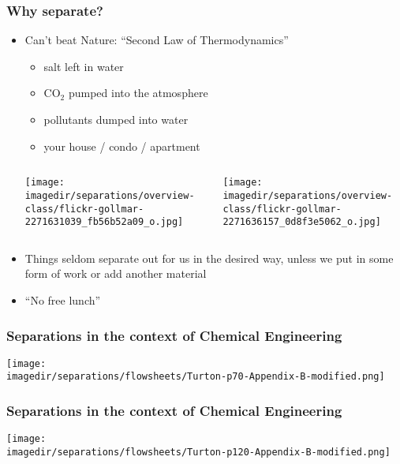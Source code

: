 \begin{frame}\frametitle{Why separate?}
	\begin{itemize}
		\item	Can't beat Nature: ``Second Law of Thermodynamics''
			\begin{itemize}
				\item	salt left in water
				\item	$\text{CO}_2$ pumped into the atmosphere
				\item	pollutants dumped into water
				\item	your house / condo / apartment
			\end{itemize}
		
		\begin{columns}[c]
				\centerline{\texttt{[image: \\imagedir/separations/overview-class/flickr-gollmar-2271631039\_fb56b52a09\_o.jpg]}}
				\centerline{\texttt{[image: \\imagedir/separations/overview-class/flickr-gollmar-2271636157\_0d8f3e5062\_o.jpg]}}
		\end{columns}
		
		\vspace{12pt}
		
		\item	Things seldom separate out for us in the desired way, unless we put in some {\color{myOrange}form of work} or {\color{myOrange}add another material}
		\item	``No free lunch''
	\end{itemize}
\end{frame}

\begin{frame}\frametitle{Separations in the context of Chemical Engineering}
	\centerline{\texttt{[image: \\imagedir/separations/flowsheets/Turton-p70-Appendix-B-modified.png]}}
\end{frame}

\begin{frame}\frametitle{Separations in the context of Chemical Engineering}
	\centerline{\texttt{[image: \\imagedir/separations/flowsheets/Turton-p120-Appendix-B-modified.png]}}
\end{frame}

